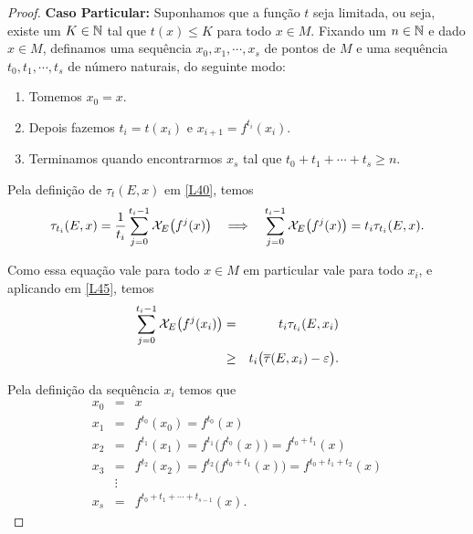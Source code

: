 \begin{proof}
\textbf{Caso Particular:} Suponhamos que a função $t$ seja limitada, ou seja, existe um $K\in\mathbb{N}$ tal que $t(x)\leq K$ para todo $x\in M$. Fixando um $n\in\mathbb{N}$ e dado $x \in M$, definamos uma sequência $x_0,x_1,\cdots,x_s$ de pontos de $M$ e uma sequência $t_0,t_1,\cdots,t_s$ de número naturais, do seguinte modo:

\begin{enumerate}
\item Tomemos $x_0=x$.
\item Depois fazemos $t_i=t(x_i)$ e $x_{i+1}=f^{t_i}(x_i)$.
\item Terminamos quando encontrarmos $x_s$ tal que $t_0+t_1+\cdots+t_s\geq n$.
\end{enumerate}

Pela definição de $\tau_t(E,x)$ em \eqref{L40}, temos
\begin{equation*}
\tau_{t_i}(E,x)=\dfrac{1}{t_i}\sum_{j=0}^{t_i-1}\mathcal{X}_{E}\big(f^j(x)\big)\quad\Longrightarrow\quad\sum_{j=0}^{t_i-1}\mathcal{X}_{E}\big(f^j(x)\big)=t_i\tau_{t_i}(E,x).
\end{equation*}

Como essa equação vale para todo $x\in M$ em particular vale para todo $x_i$, e aplicando em \eqref{L45}, temos
\begin{eqnarray}
\sum_{j=0}^{t_i-1}\mathcal{X}_{E}\big(f^j(x_i)\big) & = &  t_i\tau_{t_i}(E,x_i)\nonumber\\
 & \geq & t_i\big(\overline{\tau}(E,x_i)-\varepsilon\big).\label{L46}
\end{eqnarray}

Pela definição da sequência $x_i$ temos que
\begin{eqnarray*} 
x_0 & = & x\\
x_1 & = & f^{t_0}(x_0) = f^{t_0}(x)\\
x_2 & = & f^{t_1}(x_1) = f^{t_1}\big(f^{t_0}(x)\big) = f^{t_0+t_1}(x)\\
x_3 & = & f^{t_2}(x_2) = f^{t_2}\big(f^{t_0+t_1}(x)\big) = f^{t_0+t_1+t_2}(x)\\
& \vdots & \\
x_s & = & f^{t_0+t_1+\cdots+t_{s-1}}(x).
\end{eqnarray*}


\end{proof}
